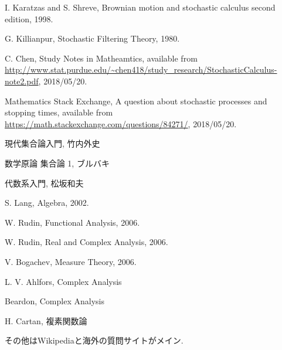 \begin{thebibliography}{数字}
	 I. Karatzas and S. Shreve, Brownian motion and stochastic calculus second edition, 1998.
	
	 G. Killianpur, Stochastic Filtering Theory, 1980. 
	
	 C. Chen, Study Notes in Matheamtics, available from \url{http://www.stat.purdue.edu/~chen418/study_research/StochasticCalculus-note2.pdf}, 2018/05/20.

	 Mathematics Stack Exchange, A question about stochastic processes and stopping times, available from \url{https://math.stackexchange.com/questions/84271/}, 2018/05/20.
	
	 現代集合論入門, 竹内外史
	
	 数学原論 集合論 1, ブルバキ
	
	 代数系入門, 松坂和夫
	
	 S. Lang, Algebra, 2002.
	
	 W. Rudin, Functional Analysis, 2006.
	
	 W. Rudin, Real and Complex Analysis, 2006.
	
	 V. Bogachev, Measure Theory, 2006.
	
	 L. V. Ahlfors, Complex Analysis
	
	 Beardon, Complex Analysis
	
	 H. Cartan, 複素関数論
	
	 その他はWikipediaと海外の質問サイトがメイン.
\end{thebibliography}